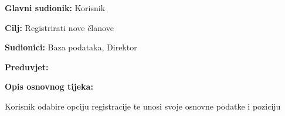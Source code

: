 				\noindent {}
				\begin{packed_item}
					
					\item \textbf{Glavni sudionik:} Korisnik
					\item  \textbf{Cilj:} Registrirati nove članove
					\item  \textbf{Sudionici:} Baza podataka, Direktor
					\item  \textbf{Preduvjet:} 
					\item  \textbf{Opis osnovnog tijeka:}
					
					\item[] \begin{packed_enum}
						
						\item Korisnik odabire opciju registracije te unosi svoje osnovne podatke i poziciju

					\end{packed_enum}
					
				\end{packed_item}
			
